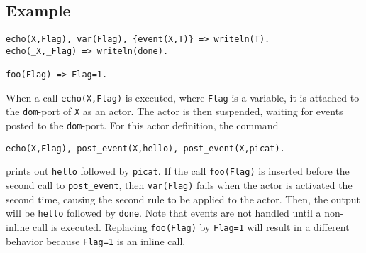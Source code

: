 \subsection*{Example}
\begin{verbatim}
echo(X,Flag), var(Flag), {event(X,T)} => writeln(T).
echo(_X,_Flag) => writeln(done).

foo(Flag) => Flag=1.
\end{verbatim}
When a call \texttt{echo(X,Flag)} is executed, where \texttt{Flag} is a variable, it is attached to the \texttt{dom}-port of \texttt{X} as an actor.  The actor is then suspended, waiting for events posted to the \texttt{dom}-port. For this actor definition, the command
\begin{small}
\begin{verbatim}
echo(X,Flag), post_event(X,hello), post_event(X,picat).
\end{verbatim}
\end{small}
prints out \texttt{hello} followed by \texttt{picat}. If the call \texttt{foo(Flag)} is inserted before the second call to \texttt{post\_event}, then \texttt{var(Flag)} fails when the actor is activated the second time, causing the second rule to be applied to the actor. Then, the output will be \texttt{hello} followed by \texttt{done}. Note that events are not handled until a non-inline call is executed. Replacing \texttt{foo(Flag)} by \texttt{Flag=1} will result in a different behavior because \texttt{Flag=1} is an inline call.


